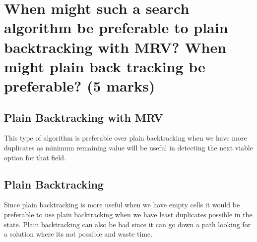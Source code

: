 \documentclass[12pt]{article}
\begin{document}
\section{\normalsize{When might such a search algorithm be preferable to plain backtracking with MRV? When might
      plain back tracking be preferable? (5 marks)}}

\subsection{Plain Backtracking with MRV}
This type of algorithm is preferable over plain backtracking when we have more duplicates as minimum remaining value will be useful in detecting the next viable option for that field.
\subsection{Plain Backtracking}
Since plain backtracking is more useful when we have empty cells it would be preferable to use plain backtracking when we have least duplicates possible in the state. Plain backtracking can also be bad since it can go down a path looking for a solution where its not possible and waste time.
\end{document}
